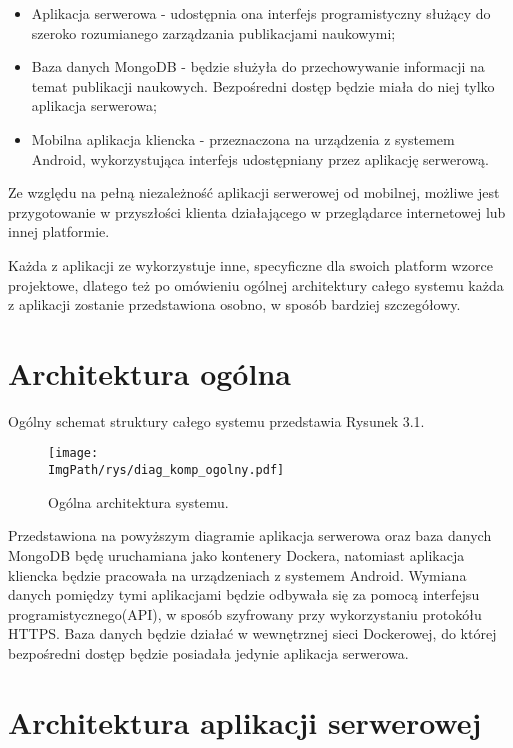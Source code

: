 \documentclass[a4paper,12pt,twoside,openany]{report}
\newcommand{\ImgPath}{.}
\begin{document}
\begin{itemize}
	\item Aplikacja serwerowa - udostępnia ona interfejs programistyczny służący do szeroko rozumianego zarządzania publikacjami naukowymi; 
	\item Baza danych MongoDB - będzie służyła do przechowywanie informacji na temat publikacji naukowych. Bezpośredni dostęp będzie miała do niej tylko aplikacja serwerowa;
	\item Mobilna aplikacja kliencka - przeznaczona na urządzenia z systemem Android, wykorzystująca interfejs udostępniany przez aplikację serwerową.
\end{itemize}

Ze względu na pełną niezależność aplikacji serwerowej od mobilnej, możliwe jest przygotowanie w przyszłości klienta działającego w przeglądarce internetowej lub innej platformie. 

Każda z aplikacji ze wykorzystuje inne, specyficzne dla swoich platform wzorce projektowe, dlatego też po omówieniu ogólnej architektury całego systemu  każda z aplikacji zostanie przedstawiona osobno, w sposób bardziej szczegółowy. 

\newpage
\section{Architektura ogólna}
Ogólny schemat struktury całego systemu przedstawia Rysunek 3.1.

 \begin{figure}[!htbp]
 	\begin{center}
 		\centering
 		\texttt{[image: \\ImgPath/rys/diag\_komp\_ogolny.pdf]}
 	\end{center}
 	\caption{Ogólna architektura systemu.}
 	\label{ogolnaArchitektura}
 \end{figure}
 Przedstawiona na powyższym diagramie aplikacja serwerowa oraz baza danych MongoDB będę uruchamiana jako kontenery Dockera, natomiast aplikacja kliencka będzie pracowała na urządzeniach z systemem Android. Wymiana danych pomiędzy tymi aplikacjami będzie odbywała się za pomocą interfejsu programistycznego(API), w sposób szyfrowany przy wykorzystaniu protokółu HTTPS.
 Baza danych będzie działać w wewnętrznej sieci Dockerowej, do której bezpośredni dostęp będzie posiadała jedynie aplikacja serwerowa. 

\section{Architektura aplikacji serwerowej}
\end{document}
